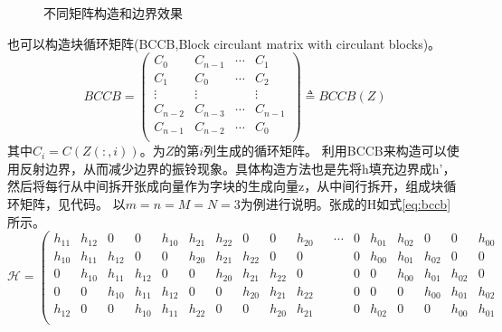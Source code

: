 \documentclass[UTF8]{ctexart}
\begin{document}
\begin{sloppypar}
\begin{figure}[htbp]
            \label{fig:ciculantM}
            \caption{\small 不同矩阵构造和边界效果}
        \end{figure}
        也可以构造块循环矩阵(BCCB,Block circulant matrix with circulant blocks)。
        \begin{equation}
            BCCB = \begin{pmatrix} C_0    &    C_{n-1}    &    \cdots    & C_1 \\
            C_1    &    C_0        &    \cdots    & C_2 \\
            \vdots &    \vdots     &              & \vdots \\
            C_{n-2}&    C_{n-3}    &    \cdots    & C_{n-1} \\
            C_{n-1}&    C_{n-2}    &    \cdots    & C_{0} \\
            \end{pmatrix} \triangleq BCCB(Z)
            \label{eq:mbBccb}
        \end{equation}
        其中$C_i = C(Z(:,i))$。为$Z$的第$i$列生成的循环矩阵。
        利用BCCB来构造可以使用反射边界，从而减少边界的振铃现象。具体构造方法也是先将h填充边界成h’，然后将每行从中间拆开张成向量作为字块的生成向量z，从中间行拆开，组成块循环矩阵，见代码。
        以$m=n=M=N=3$为例进行说明。张成的H如式\eqref{eq:bccb}所示。
        \begin{equation}
            \mathcal{H}= \left(   \begin{array}{ccccc|ccccc|ccc|ccccc}
                                      h_{11}&   h_{12} &    0   &  0     &  h_{10} &  h_{21} & h_{22} &   0    &   0     &h_{20}  & & \cdots &0& h_{01} & h_{02} & 0      & 0      & h_{00}\\
                                      h_{10}&   h_{11} & h_{12} &  0     &  0      &  h_{20} & h_{21} & h_{22} &   0     &    0   & &        &0& h_{00} & h_{01} & h_{02} & 0      & 0  \\
                                      0&        h_{10} & h_{11} & h_{12} &  0      &   0     & h_{20} & h_{21} & h_{22}  &    0   & &        &0&   0    & h_{00} & h_{01} & h_{02} & 0  \\
                                      0&         0     & h_{10} & h_{11} &  h_{12} &   0     &  0     & h_{20} & h_{21}  & h_{22} & &        &0&   0    &  0     & h_{00} & h_{01} & h_{02}  \\
                                      h_{12}&    0     &    0   & h_{10} &  h_{11} &   h_{22}&  0     & 0      & h_{20}  & h_{21} & &        &0& h_{02} &  0     & 0      & h_{00} & h_{01}  \\

\end{array}
\end{equation}
\end{sloppypar}
\end{document}
